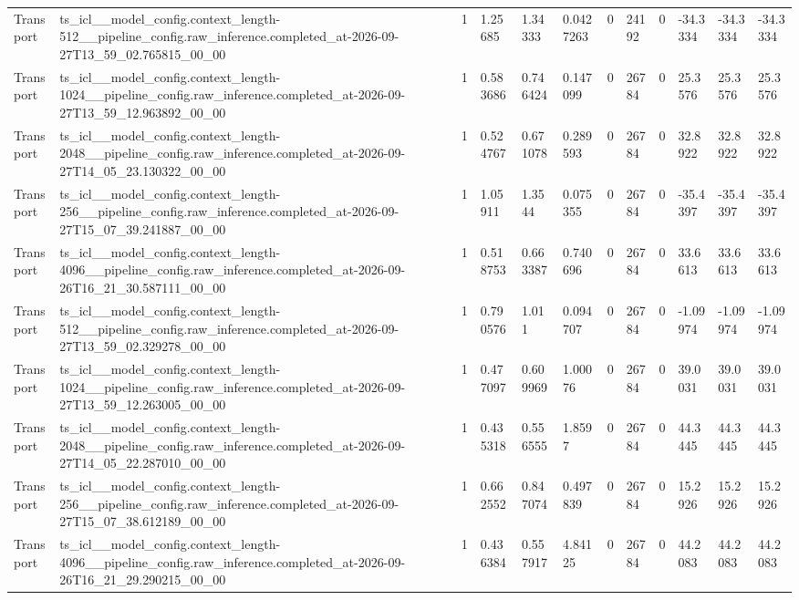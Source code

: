 \begin{tabular}{llllllllllll}
Transport & ts\_icl\_\_model\_config.context\_length-512\_\_pipeline\_config.raw\_inference.completed\_at-2026-09-27T13\_59\_02.765815\_00\_00 & 1 & 1.25685 & 1.34333 & 0.0427263 & 0 & 24192 & 0 & -34.3334 & -34.3334 & -34.3334 \\
Transport & ts\_icl\_\_model\_config.context\_length-1024\_\_pipeline\_config.raw\_inference.completed\_at-2026-09-27T13\_59\_12.963892\_00\_00 & 1 & 0.583686 & 0.746424 & 0.147099 & 0 & 26784 & 0 & 25.3576 & 25.3576 & 25.3576 \\
Transport & ts\_icl\_\_model\_config.context\_length-2048\_\_pipeline\_config.raw\_inference.completed\_at-2026-09-27T14\_05\_23.130322\_00\_00 & 1 & 0.524767 & 0.671078 & 0.289593 & 0 & 26784 & 0 & 32.8922 & 32.8922 & 32.8922 \\
Transport & ts\_icl\_\_model\_config.context\_length-256\_\_pipeline\_config.raw\_inference.completed\_at-2026-09-27T15\_07\_39.241887\_00\_00 & 1 & 1.05911 & 1.3544 & 0.075355 & 0 & 26784 & 0 & -35.4397 & -35.4397 & -35.4397 \\
Transport & ts\_icl\_\_model\_config.context\_length-4096\_\_pipeline\_config.raw\_inference.completed\_at-2026-09-26T16\_21\_30.587111\_00\_00 & 1 & 0.518753 & 0.663387 & 0.740696 & 0 & 26784 & 0 & 33.6613 & 33.6613 & 33.6613 \\
Transport & ts\_icl\_\_model\_config.context\_length-512\_\_pipeline\_config.raw\_inference.completed\_at-2026-09-27T13\_59\_02.329278\_00\_00 & 1 & 0.790576 & 1.011 & 0.094707 & 0 & 26784 & 0 & -1.09974 & -1.09974 & -1.09974 \\
Transport & ts\_icl\_\_model\_config.context\_length-1024\_\_pipeline\_config.raw\_inference.completed\_at-2026-09-27T13\_59\_12.263005\_00\_00 & 1 & 0.477097 & 0.609969 & 1.00076 & 0 & 26784 & 0 & 39.0031 & 39.0031 & 39.0031 \\
Transport & ts\_icl\_\_model\_config.context\_length-2048\_\_pipeline\_config.raw\_inference.completed\_at-2026-09-27T14\_05\_22.287010\_00\_00 & 1 & 0.435318 & 0.556555 & 1.8597 & 0 & 26784 & 0 & 44.3445 & 44.3445 & 44.3445 \\
Transport & ts\_icl\_\_model\_config.context\_length-256\_\_pipeline\_config.raw\_inference.completed\_at-2026-09-27T15\_07\_38.612189\_00\_00 & 1 & 0.662552 & 0.847074 & 0.497839 & 0 & 26784 & 0 & 15.2926 & 15.2926 & 15.2926 \\
Transport & ts\_icl\_\_model\_config.context\_length-4096\_\_pipeline\_config.raw\_inference.completed\_at-2026-09-26T16\_21\_29.290215\_00\_00 & 1 & 0.436384 & 0.557917 & 4.84125 & 0 & 26784 & 0 & 44.2083 & 44.2083 & 44.2083 \\

\end{tabular}
